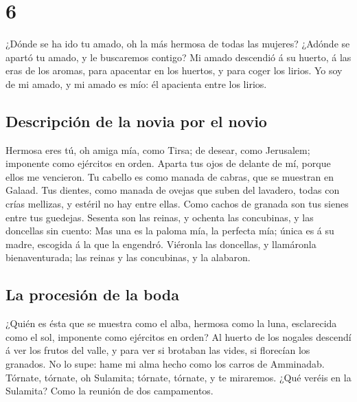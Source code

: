 \hypertarget{section-5}{%
\section{6}\label{section-5}}

 ¿Dónde se ha ido tu amado, oh la más hermosa de todas las
mujeres? ¿Adónde se apartó tu amado, y le buscaremos contigo?
 Mi amado descendió á su huerto, á las eras de los aromas,
para apacentar en los huertos, y para coger los lirios. 
Yo soy de mi amado, y mi amado es mío: él apacienta entre los lirios.

\hypertarget{descripciuxf3n-de-la-novia-por-el-novio-1}{%
\subsection{Descripción de la novia por el
novio}\label{descripciuxf3n-de-la-novia-por-el-novio-1}}

 Hermosa eres tú, oh amiga mía, como Tirsa; de desear,
como Jerusalem; imponente como ejércitos en orden.  Aparta
tus ojos de delante de mí, porque ellos me vencieron. Tu cabello es como
manada de cabras, que se muestran en Galaad.  Tus dientes,
como manada de ovejas que suben del lavadero, todas con crías mellizas,
y estéril no hay entre ellas.  Como cachos de granada son
tus sienes entre tus guedejas.  Sesenta son las reinas, y
ochenta las concubinas, y las doncellas sin cuento:  Mas
una es la paloma mía, la perfecta mía; única es á su madre, escogida á
la que la engendró. Viéronla las doncellas, y llamáronla bienaventurada;
las reinas y las concubinas, y la alabaron.

\hypertarget{la-procesiuxf3n-de-la-boda}{%
\subsection{La procesión de la boda}\label{la-procesiuxf3n-de-la-boda}}

 ¿Quién es ésta que se muestra como el alba, hermosa como
la luna, esclarecida como el sol, imponente como ejércitos en orden?
 Al huerto de los nogales descendí á ver los frutos del
valle, y para ver si brotaban las vides, si florecían los granados.
 No lo supe: hame mi alma hecho como los carros de
Amminadab.  Tórnate, tórnate, oh Sulamita; tórnate,
tórnate, y te miraremos. ¿Qué veréis en la Sulamita? Como la reunión de
dos campamentos.

